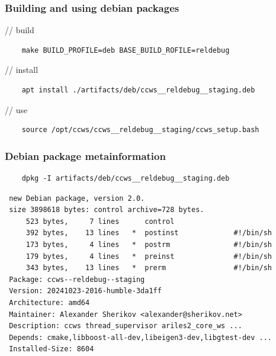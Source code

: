 \documentclass[hyperref={colorlinks=false, breaklinks=true},11pt]{beamer}
\begin{document}
\begin{frame}[fragile]
    \frametitle{Building and using debian packages}
\begin{block}{}
// build
\begin{verbatim}
    make BUILD_PROFILE=deb BASE_BUILD_ROFILE=reldebug
\end{verbatim}
\end{block}

\begin{block}{}
// install
\begin{verbatim}
    apt install ./artifacts/deb/ccws__reldebug__staging.deb
\end{verbatim}
\end{block}

\begin{block}{}
// use
\begin{verbatim}
    source /opt/ccws/ccws__reldebug__staging/ccws_setup.bash
\end{verbatim}
\end{block}
\end{frame}

\begin{frame}[fragile]
    \frametitle{Debian package metainformation}
\begin{block}{}
\begin{verbatim}
    dpkg -I artifacts/deb/ccws__reldebug__staging.deb
\end{verbatim}
\end{block}
\small{
\begin{verbatim}
 new Debian package, version 2.0.
 size 3898618 bytes: control archive=728 bytes.
     523 bytes,     7 lines      control
     392 bytes,    13 lines   *  postinst             #!/bin/sh
     173 bytes,     4 lines   *  postrm               #!/bin/sh
     179 bytes,     4 lines   *  preinst              #!/bin/sh
     343 bytes,    13 lines   *  prerm                #!/bin/sh
 Package: ccws--reldebug--staging
 Version: 20241023-2016-humble-3da1ff
 Architecture: amd64
 Maintainer: Alexander Sherikov <alexander@sherikov.net>
 Description: ccws thread_supervisor ariles2_core_ws ...
 Depends: cmake,libboost-all-dev,libeigen3-dev,libgtest-dev ...
 Installed-Size: 8604
\end{verbatim}
}
\end{frame}


\end{document}
